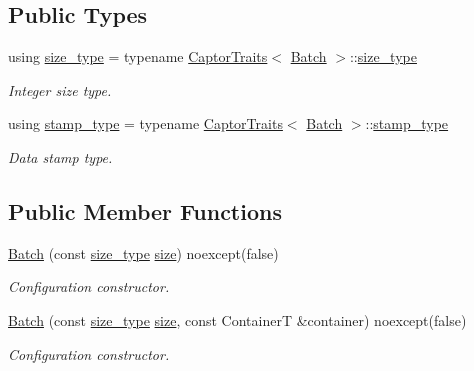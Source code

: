 \subsection*{Public Types}
\begin{DoxyCompactItemize}
\item 
\mbox{\label{classflow_1_1driver_1_1_batch_aa2930228e4fd0f1231a89a5224ae2a0a}} 
using \hyperlink{classflow_1_1driver_1_1_batch_aa2930228e4fd0f1231a89a5224ae2a0a}{size\+\_\+type} = typename \hyperlink{structflow_1_1_captor_traits}{Captor\+Traits}$<$ \hyperlink{classflow_1_1driver_1_1_batch}{Batch} $>$\+::\hyperlink{classflow_1_1driver_1_1_batch_aa2930228e4fd0f1231a89a5224ae2a0a}{size\+\_\+type}
\begin{DoxyCompactList}\small\item\em Integer size type. \end{DoxyCompactList}\item 
\mbox{\label{classflow_1_1driver_1_1_batch_aa993b31fca23f7acbd0cee04b3185333}} 
using \hyperlink{classflow_1_1driver_1_1_batch_aa993b31fca23f7acbd0cee04b3185333}{stamp\+\_\+type} = typename \hyperlink{structflow_1_1_captor_traits}{Captor\+Traits}$<$ \hyperlink{classflow_1_1driver_1_1_batch}{Batch} $>$\+::\hyperlink{classflow_1_1driver_1_1_batch_aa993b31fca23f7acbd0cee04b3185333}{stamp\+\_\+type}
\begin{DoxyCompactList}\small\item\em Data stamp type. \end{DoxyCompactList}\end{DoxyCompactItemize}
\subsection*{Public Member Functions}
\begin{DoxyCompactItemize}
\item 
\hyperlink{classflow_1_1driver_1_1_batch_aab925c03810bbef505446e72871127d6}{Batch} (const \hyperlink{classflow_1_1driver_1_1_batch_aa2930228e4fd0f1231a89a5224ae2a0a}{size\+\_\+type} \hyperlink{classflow_1_1_captor_interface_a1a4b3f7f6c1bd16a2cb672d90a1cbbc0}{size}) noexcept(false)
\begin{DoxyCompactList}\small\item\em Configuration constructor. \end{DoxyCompactList}\item 
\hyperlink{classflow_1_1driver_1_1_batch_a5c50e03f90dd71df05f988b203a72450}{Batch} (const \hyperlink{classflow_1_1driver_1_1_batch_aa2930228e4fd0f1231a89a5224ae2a0a}{size\+\_\+type} \hyperlink{classflow_1_1_captor_interface_a1a4b3f7f6c1bd16a2cb672d90a1cbbc0}{size}, const ContainerT \&container) noexcept(false)
\begin{DoxyCompactList}\small\item\em Configuration constructor. \end{DoxyCompactList}\end{DoxyCompactItemize}
